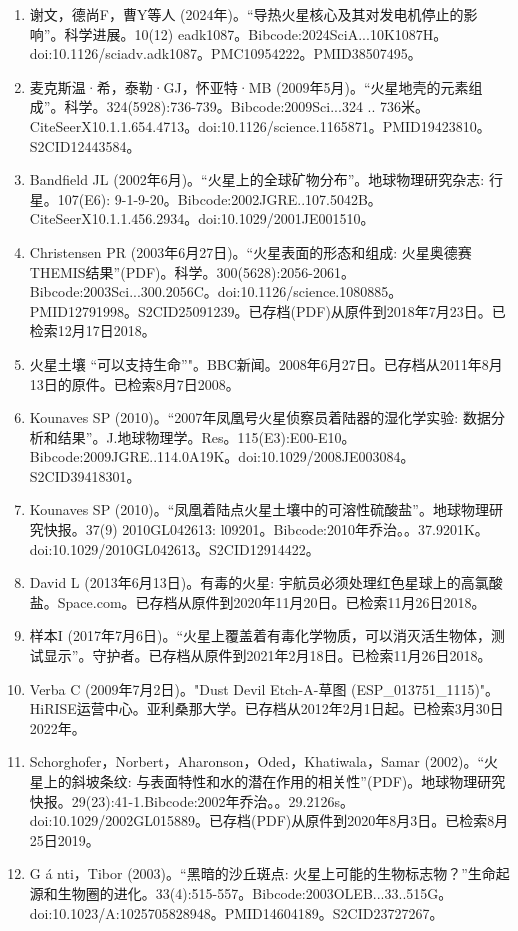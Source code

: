 \begin{enumerate}
\item 谢文，德尚F，曹Y等人 (2024年)。“导热火星核心及其对发电机停止的影响”。科学进展。10(12) eadk1087。Bibcode:2024SciA...10K1087H。doi:10.1126/sciadv.adk1087。PMC10954222。PMID38507495。  
\item 麦克斯温·希，泰勒·GJ，怀亚特·MB (2009年5月)。“火星地壳的元素组成”。科学。324(5928):736-739。Bibcode:2009Sci...324 .. 736米。CiteSeerX10.1.1.654.4713。doi:10.1126/science.1165871。PMID19423810。S2CID12443584。   
\item Bandfield JL (2002年6月)。“火星上的全球矿物分布”。地球物理研究杂志: 行星。107(E6): 9-1-9-20。Bibcode:2002JGRE..107.5042B。CiteSeerX10.1.1.456.2934。doi:10.1029/2001JE001510。 
\item Christensen PR (2003年6月27日)。“火星表面的形态和组成: 火星奥德赛THEMIS结果”(PDF)。科学。300(5628):2056-2061。Bibcode:2003Sci...300.2056C。doi:10.1126/science.1080885。PMID12791998。S2CID25091239。已存档(PDF)从原件到2018年7月23日。已检索12月17日2018。   
\item 火星土壤 “可以支持生命”"。BBC新闻。2008年6月27日。已存档从2011年8月13日的原件。已检索8月7日2008。
\item Kounaves SP (2010)。“2007年凤凰号火星侦察员着陆器的湿化学实验: 数据分析和结果”。J.地球物理学。Res。115(E3):E00-E10。Bibcode:2009JGRE..114.0A19K。doi:10.1029/2008JE003084。S2CID39418301。  
\item Kounaves SP (2010)。“凤凰着陆点火星土壤中的可溶性硫酸盐”。地球物理研究快报。37(9) 2010GL042613: l09201。Bibcode:2010年乔治。。37.9201K。doi:10.1029/2010GL042613。S2CID12914422。 
\item David L (2013年6月13日)。有毒的火星: 宇航员必须处理红色星球上的高氯酸盐。Space.com。已存档从原件到2020年11月20日。已检索11月26日2018。
\item 样本I (2017年7月6日)。“火星上覆盖着有毒化学物质，可以消灭活生物体，测试显示”。守护者。已存档从原件到2021年2月18日。已检索11月26日2018。
\item Verba C (2009年7月2日)。"Dust Devil Etch-A-草图 (ESP_013751_1115)"。HiRISE运营中心。亚利桑那大学。已存档从2012年2月1日起。已检索3月30日2022年。
\item Schorghofer，Norbert，Aharonson，Oded，Khatiwala，Samar (2002)。“火星上的斜坡条纹: 与表面特性和水的潜在作用的相关性”(PDF)。地球物理研究快报。29(23):41-1.Bibcode:2002年乔治。。29.2126s。doi:10.1029/2002GL015889。已存档(PDF)从原件到2020年8月3日。已检索8月25日2019。
\item G á nti，Tibor (2003)。“黑暗的沙丘斑点: 火星上可能的生物标志物？”生命起源和生物圈的进化。33(4):515-557。Bibcode:2003OLEB...33..515G。doi:10.1023/A:1025705828948。PMID14604189。S2CID23727267。  

\end{enumerate}
